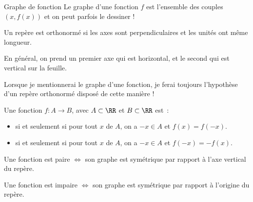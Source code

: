 \begin{frame}{Graphe de fonction}
  Le graphe d'une fonction \(f\) est l'ensemble des couples \((x,f(x))\) \pause et on peut parfois le dessiner !
  \begin{center}
\end{center}
\end{frame}

\begin{frame}
  \begin{definition}
    Un repère est orthonormé si les axes sont perpendiculaires et les unités ont même longueur.
  \end{definition}\pause
  \begin{remark}
    En général, on prend un premier axe qui est \og horizontal\fg{}, et le second qui est vertical sur la feuille.

    Lorsque je mentionnerai le graphe d'une fonction, je ferai toujours l'hypothèse d'un repère orthonormé disposé de cette manière !
  \end{remark}
\end{frame}

\begin{frame}
  \begin{definition}
    Une fonction $f \colon A \to B$, avec $A \subset \RR$ et $B \subset \RR$ est~:
    \begin{itemize}
    \item {} si et seulement si pour tout $x$ de $A$, on a $-x \in A$ et $f(x) = f(-x)$.
    \item {} si et seulement si pour tout $x$ de $A$, on a $-x \in A$ et $f(-x) = -f(x)$.
    \end{itemize}
  \end{definition}
  \begin{proposition}
    Une fonction est paire \(\iff\) son graphe est symétrique par rapport à l'axe vertical du repère.

    Une fonction est impaire \(\iff\) son graphe est symétrique par rapport à l'origine du repère.
  \end{proposition}
\end{frame}

